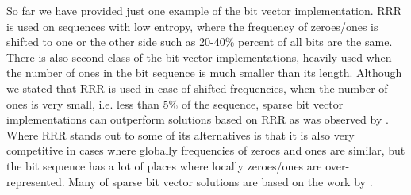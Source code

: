 So far we have provided just one example of the bit vector implementation.
RRR is used on sequences with low entropy, where the frequency of zeroes/ones
is shifted to one or the other side such as 20-40\% percent of all bits are the same.
There is also second class of the bit vector implementations, heavily
used when the number of ones in the bit sequence is much smaller than its length.
Although we stated that RRR is used in case of shifted frequencies, when the number
of ones is very small, i.e. less than 5\% of the sequence, sparse bit vector
implementations can outperform solutions based on RRR as was observed by \cite{navarro2012fast}.
Where RRR stands out to some of its alternatives is that it is also very competitive
in cases where globally frequencies of zeroes and ones are similar, but the bit
sequence has a lot of places where locally zeroes/ones are over-represented.
Many of sparse bit vector solutions are based on the work by \cite{okanohara2007practical}.